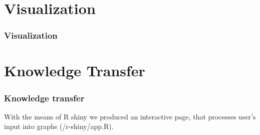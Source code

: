 \documentclass {beamer}
\begin{document}
\section{Visualization}
\begin{frame}
\frametitle{Visualization}

\end{frame}


\section{Knowledge Transfer}
\begin{frame}
\frametitle{Knowledge transfer}
With the means of R shiny we produced an interactive page, that processes user's input into graphs (/r-shiny/app.R).

\end{frame}
\end{document}
